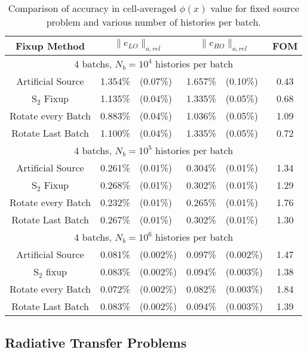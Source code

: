 \begin{table}
    \begin{tabular}{|c|cl|cl|c|} \hline
      Fixup  Method & \multicolumn{2}{|c|}{$\|e_{LO}\|_{a,rel}$} & 
        \multicolumn{2}{|c|}{$\|e_{HO}\|_{a,rel}$} &\multicolumn{1}{|c|}{FOM}
        \\ \hline 
        \multicolumn{6}{|c|}{4 batchs, $N_b = 10^4$ histories per batch} \\ \hline
     Artificial Source &1.354\%  & (0.07\%)  & 1.657\%  & (0.10\%) & 0.43  \\  
       S$_2$ Fixup &1.135\%  & (0.04\%)  & 1.335\%  & (0.05\%) & 0.68  \\  
 Rotate every Batch &0.883\%  & (0.04\%)  & 1.036\%  & (0.05\%) & 1.09  \\  
   Rotate Last Batch &1.100\%  & (0.04\%)  & 1.335\%  & (0.05\%) & 0.72  \\ \hline 
   \multicolumn{6}{|c|}{4 batchs, $N_b = 10^5$ histories per batch} \\ \hline
     Artificial Source &0.261\%  & (0.01\%)  & 0.304\%  & (0.01\%) & 1.34  \\  
       S$_2$ Fixup &0.268\%  & (0.01\%)  & 0.302\%  & (0.01\%) & 1.29  \\  
 Rotate every Batch &0.232\%  & (0.01\%)  & 0.265\%  & (0.01\%) & 1.76  \\  
   Rotate Last Batch &0.267\%  & (0.01\%)  & 0.302\%  & (0.01\%) & 1.30  \\ \hline 
   \multicolumn{6}{|c|}{4 batchs, $N_b = 10^6$ histories per batch} \\ \hline
     Artificial Source &0.081\%  & (0.002\%)  & 0.097\%  & (0.002\%) & 1.47  \\  
       S$_2$ fixup &0.083\%  & (0.002\%)  & 0.094\%  & (0.003\%) & 1.38  \\  
 Rotate every Batch &0.072\%  & (0.002\%)  & 0.082\%  & (0.003\%) & 1.84  \\  
   Rotate Last Batch &0.083\%  & (0.002\%)  & 0.094\%  & (0.003\%) & 1.39  \\ \hline 
    \end{tabular}
    \caption{\label{tab:fixed_source_accuracy} Comparison of accuracy in cell-averaged $\phi(x)$ value for
fixed source problem and various number of histories per batch.}
\end{table}

\subsection{Radiative Transfer Problems}

